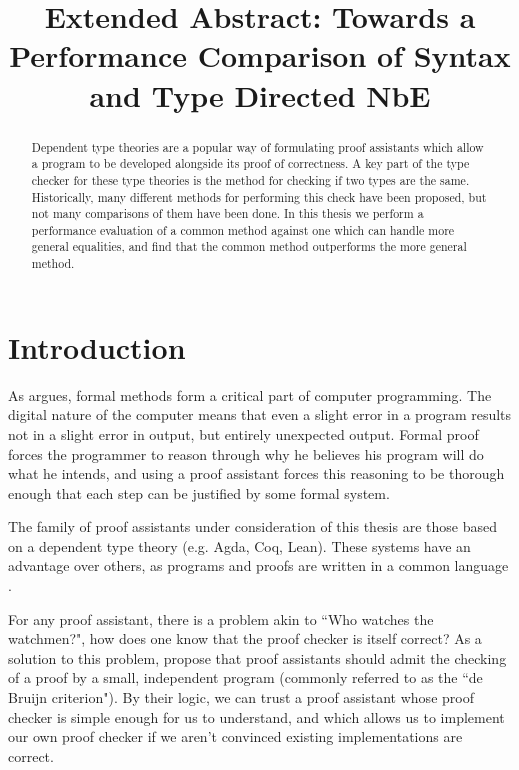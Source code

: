 \documentclass[sigplan]{acmart}
\title{Extended Abstract: Towards a Performance Comparison of Syntax and Type Directed NbE}
\begin{document}
\begin{abstract}
Dependent type theories are a popular way of formulating proof assistants which allow a program to be developed alongside its proof of correctness.
A key part of the type checker for these type theories is the method for checking if two types are the same.
Historically, many different methods for performing this check have been proposed, but not many comparisons of them have been done.
In this thesis we perform a performance evaluation of a common method against one which can handle more general equalities, and find that the common method outperforms the more general method.
\end{abstract}

\maketitle

\section{Introduction}

As \citet{Dijkstra1988} argues, formal methods form a critical part of computer programming.
The digital nature of the computer means that even a slight error in a program results not in a slight error in output, but entirely unexpected output.
Formal proof forces the programmer to reason through why he believes his program will do what he intends, and using a proof assistant forces this reasoning to be thorough enough that each step can be justified by some formal system.

The family of proof assistants under consideration of this thesis are those based on a dependent type theory (e.g. Agda, Coq, Lean).
These systems have an advantage over others, as programs and proofs are written in a common language \citep{Nordstrom1990}.

For any proof assistant, there is a problem akin to ``Who watches the watchmen?", how does one know that the proof checker is itself correct?
As a solution to this problem, \citet{Barendregt2005} propose that proof assistants should admit the checking of a proof by a small, independent program (commonly referred to as the ``de Bruijn criterion").
By their logic, we can trust a proof assistant whose proof checker is simple enough for us to understand, and which allows us to implement our own proof checker if we aren't convinced existing implementations are correct.
\end{document}
